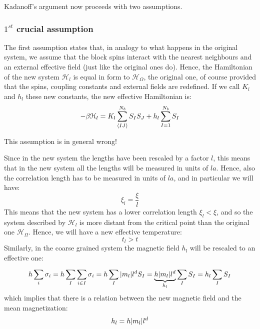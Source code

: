 \documentclass[../../Main/Main.tex]{subfiles}
\begin{document}
\noindent Kadanoff's argument now proceeds with two assumptions.

\subsubsection{\(  1^{st} \) crucial assumption}
The first assumption states that, in analogy to what happens in the original system, we assume that the block spins interact with the nearest neighbours and an external effective field (just like the original ones do). Hence, the Hamiltonian of the new system \( \mathcal{H}_l \) is equal in form to \( \mathcal{H}_ \Omega  \), the original one, of course provided that the spins, coupling constants and external fields are redefined.  If we call \( K_l \)  and \( h_l \) these new constants, the new effective Hamiltonian is:
\begin{equation}
  - \beta \mathcal{H}_l = K_l \sum_{\expval{IJ} }^{N_b} S_I S_J  + h_l \sum_{I=1}^{N_b} S_I
\end{equation}
\begin{remark}
This assumption is in general wrong!
\end{remark}
Since in the new system the lengths have been rescaled by a factor \( l \), this
means that in the new system all the lengths will be measured in units of \( la \).  Hence, also the correlation length  has to be measured in units of \( la \), and in particular we will have:
\begin{equation*}
  \xi _l = \frac{\xi }{l}
\end{equation*}
This means that the new system has a lower correlation length \( \xi _l < \xi  \), and so the system described by \( \mathcal{H}_l \)   is more distant from the critical point than the original one \( \mathcal{H}_{\Omega }\). Hence, we will have a new effective temperature:
\begin{equation*}
  t_l > t
\end{equation*}
 Similarly, in the coarse grained system the magnetic field \( h_l \) will be rescaled to an effective one:
\begin{equation*}
  h \sum_{i}^{} \sigma _i = h \sum_{I}^{} \sum_{i \in I}^{}  \sigma _i = h \sum_{I}^{}    \abs{m_l} l^d S_I
  = \underbrace{h \abs{m_l} l^d}_{h_l} \sum_{I}^{} S_I = h_l \sum_{I}^{} S_I
\end{equation*}
which implies that there is a relation between the new magnetic field and the mean magnetization:
\begin{equation*}
  h_l = h \abs{m_l} l^d
\end{equation*}
\end{document}
